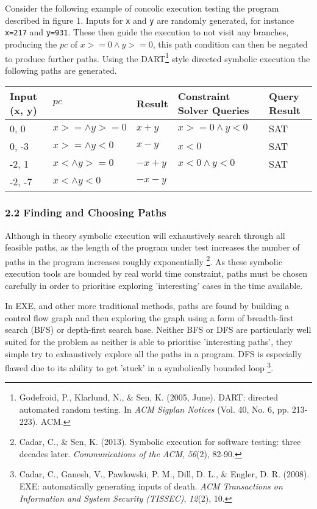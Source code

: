 \documentclass[]{article}
\begin{document}
Consider the following example of concolic execution testing the program
described in figure 1. Inputs for \texttt{x} and \texttt{y} are randomly
generated, for instance \texttt{x=217} and \texttt{y=931}. These then
guide the execution to not visit any branches, producing the \(pc\) of
\(x >= 0 \land y >=0\), this path condition can then be negated to
produce further paths. Using the DART\footnote{Godefroid, P., Klarlund,
  N., \& Sen, K. (2005, June). DART: directed automated random testing.
  In \emph{ACM Sigplan Notices} (Vol. 40, No. 6, pp. 213-223). ACM.}
style directed symbolic execution the following paths are generated.

\begin{longtable}[]{@{}lllll@{}}
\toprule
Input (x, y) & \(pc\) & Result & Constraint Solver Queries & Query
Result\tabularnewline
\midrule
\endhead
0, 0 & \(x >= \land y >= 0\) & \(x+y\) & \(x >=0 \land y < 0 \) &
SAT\tabularnewline
0, -3 & \(x >= \land y < 0\) & \(x - y\) & \(x <0 \) &
SAT\tabularnewline
-2, 1 & \(x < \land y >= 0\) & \(-x+y\) & \(x<0 \land y < 0 \) &
SAT\tabularnewline
-2, -7 & \(x < \land y < 0\) & \(-x-y\) & &\tabularnewline
\bottomrule
\end{longtable}

\hypertarget{header-n78}{%
\subsubsection{2.2 Finding and Choosing Paths}\label{header-n78}}

Although in theory symbolic execution will exhaustively search through
all feasible paths, as the length of the program under test increases
the number of paths in the program increases roughly exponentially
\footnote{Cadar, C., \& Sen, K. (2013). Symbolic execution for software
  testing: three decades later. \emph{Communications of the ACM},
  \emph{56}(2), 82-90.}. As these symbolic execution tools are bounded
by real world time constraint, paths must be chosen carefully in order
to prioritise exploring 'interesting' cases in the time available.

In EXE, and other more traditional methods, paths are found by building
a control flow graph and then exploring the graph using a form of
breadth-first search (BFS) or depth-first search base. Neither BFS or
DFS are particularly well suited for the problem as neither is able to
prioritise 'interesting paths', they simple try to exhaustively explore
all the paths in a program. DFS is especially flawed due to its ability
to get 'stuck' in a symbolically bounded loop \footnote{Cadar, C.,
  Ganesh, V., Pawlowski, P. M., Dill, D. L., \& Engler, D. R. (2008).
  EXE: automatically generating inputs of death. \emph{ACM Transactions
  on Information and System Security (TISSEC)}, \emph{12}(2), 10.}.
\end{document}
